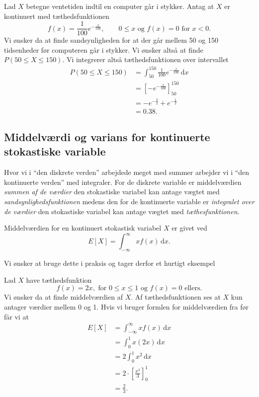 \begin{eks}
  Lad $X$ betegne ventetiden indtil en computer går i stykker. Antag at $X$ er kontinuert med tæthedsfunktionen
  \[ 
  f(x) = \frac{1}{100}e^{-\frac{x}{100}}, \qquad 0 \leq x \text{ og } f(x) = 0 \text{ for } x<0
  .\]
  Vi ønsker da at finde sandsynligheden for at der går mellem 50 og 150 tidsenheder før computeren går i stykker. Vi ønsker altså at finde $P(50 \leq X \leq 150)$. Vi integrerer altså tæthedsfunktionen over intervallet
  \begin{align*}
    P(50 \leq X \leq 150) &= \int_{50}^{150} \frac{1}{100} e^{-\frac{x}{100}} \, \mathrm{d}x \\
    &= \left[ -e^{-\frac{x}{100}} \right]_{50}^{150} \\
    &= -e^{-\frac{3}{2}} + e^{-\frac{1}{2}} \\
    &= \num{0,38} 
.\end{align*}
\end{eks}

\subsection{Middelværdi og varians for kontinuerte stokastiske variable}
Hvor vi i ``den diskrete verden'' arbejdede meget med summer arbejder vi i ``den kontinuerte verden'' med integraler. For de diskrete variable er middelværdien \textit{summen af de værdier} den stokastiske variabel kan antage vægtet med \textit{sandsynlighedsfunktionen} medens den for de kontinuerte variable er \textit{integralet over de værdier} den stokastiske variabel kan antage vægtet med \textit{tæthesfunktionen}.

\begin{sæt}
  Middelværdien for en kontinuert stokastisk variabel $X$ er givet ved
  \[ 
    E[X] = \int_{-\infty}^{\infty} xf(x) \, \mathrm{d}x 
  .\]
\end{sæt}

Vi ønsker at bruge dette i praksis og tager derfor et hurtigt eksempel

\begin{eks}
  Lad $X$ have tæthedsfunktion
  \[ 
    f(x) = 2x, \text{ for } 0\leq x\leq 1 \text{ og } f(x) = 0 \text{ ellers}
  .\]
  Vi ønsker da at finde middelværdien af $X$. Af tæthedsfunktionen ses at $X$ kun antager værdier mellem 0 og 1. Hvis vi bruger formlen for middelværdien fra før får vi at
  \begin{align*}
    E[X] &= \int_{-\infty}^{\infty} xf(x) \, \mathrm{d}x  \\
    &= \int_{0}^{1} x(2x) \, \mathrm{d}x  \\
    &= 2 \int_{0}^{1} x^2 \, \mathrm{d}x  \\
    &= 2 \cdot \left[ \frac{x^3}{3} \right]_0^{1} \\
    &= \frac{2}{3}
  .\end{align*}
\end{eks}

